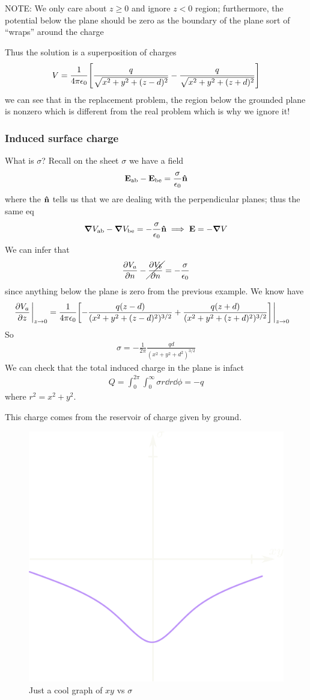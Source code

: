 \documentclass[../main.tex]{subfiles}
\begin{document}
NOTE: We only care about $z \geq 0$ and ignore $z < 0$ region; furthermore, the potential below the plane should be zero as the boundary of the plane sort of ``wraps'' around the charge

Thus the solution is a superposition of charges
\begin{align*}
    V = \ke \qt[\frac{q}{\sqrt{x^2 + y^2 + (z-d)^2}} - \frac{q}{\sqrt{x^2 + y^2 + (z+d)^2}}]
\end{align*}
we can see that in the replacement problem, the region below the grounded plane is nonzero which is different from the real problem which is why we ignore it!

\subsubsection{Induced surface charge} 

What is $\sigma$? Recall on the sheet $\sigma$ we have a field
\begin{align*}
    \vb E_\textrm{ab} - \vb E_\textrm{be} = \frac{\sigma}{\epsilon_0} \vu n
\end{align*}
where the $\vu n$ tells us that we are dealing with the perpendicular planes; thus the same eq
\begin{align*}
    \grad V_\text{ab} - \grad V_\text{be} = -\frac{\sigma}{\epsilon_0} \vu n \implies \vb E = -\grad V
\end{align*}
We can infer that
\begin{align*}
    \pdv{V_a}{n} - \cancel{\pdv{V_b}{n}} = -\frac{\sigma}{\epsilon_0}
\end{align*}
since anything below the plane is zero from the previous example. We know have
\begin{align*}
    \pdv{V_a}{z} \eval_{z\to 0} &= \ke \qt[-\frac{q(z-d)}{(x^2 + y^2 + (z-d)^2)^{3/2}} + \frac{q(z+d)}{(x^2 + y^2 + (z+d)^2)^{3/2}}] \eval_{z\to 0}
\end{align*}
So
\begin{align*}
    \sigma = -\frac{1}{2\pi} \frac{qd}{(x^2 + y^2 + d^2)^{3/2}}
\end{align*}
We can check that the total induced charge in the plane is infact
\begin{align*}
    Q = \int_0^{2\pi} \int_0^\infty \sigma  r\dd r \dd\phi = - q
\end{align*}
where $r^2 = x^2 + y^2$.

This charge comes from the reservoir of charge given by ground.

\begin{figure}[ht]
    \centering
    \includegraphics[width=0.3\linewidth]{fig3_11.png}
    \caption{Just a cool graph of $xy$ vs $\sigma$}
    \label{fig:lecture3_11}
\end{figure}
\end{document}
